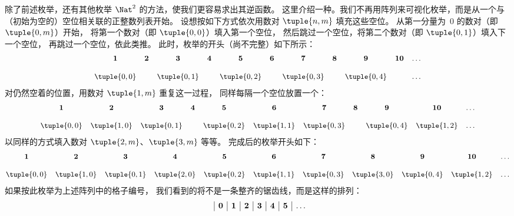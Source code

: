 \documentclass[../../../include/open-logic-section]{subfiles}
\begin{document}


\begin{explain}
除了前述枚举，还有其他枚举 $\Nat^2$ 的方法，使我们更容易求出其逆函数。
这里介绍一种。我们不再用阵列来可视化枚举，而是从一个与（初始为空的）空位相关联的正整数列表开始。
设想按如下方式依次用数对 $\tuple{n,m}$ 填充这些空位。
从第一分量为~$0$ 的数对（即 $\tuple{0,m}$）开始，
将第一个数对（即 $\tuple{0,0}$）填入第一个空位，
然后跳过一个空位，将第二个数对（即 $\tuple{0,1}$）填入下一个空位，
再跳过一个空位，依此类推。
此时，枚举的开头（尚不完整）如下所示：
\[\small
\begin{array}{@{}c c c c c c c c c c c@{}}
\mathbf 1 & \mathbf 2 & \mathbf 3 & \mathbf 4 & \mathbf 5 & \mathbf 6 & \mathbf 7 & \mathbf 8 & \mathbf 9 & \mathbf{10} & \dots \\ \\
\tuple{0,0} &  & \tuple{0,1} &  & \tuple{0,2} &  & \tuple{0,3} & & \tuple{0,4} &  & \dots \\
\end{array}
\]
对仍然空着的位置，用数对 $\tuple{1,m}$ 重复这一过程，
同样每隔一个空位放置一个：
\[\small
\begin{array}{@{}c c c c c c c c c c c@{}}
\mathbf 1 & \mathbf 2 & \mathbf 3 & \mathbf 4 & \mathbf 5 & \mathbf 6 & \mathbf 7 & \mathbf 8 & \mathbf 9 & \mathbf{10} & \dots \\ \\
\tuple{0,0} & \tuple{1,0} & \tuple{0,1} &  & \tuple{0,2} & \tuple{1,1} &
\tuple{0,3} & & \tuple{0,4} &  \tuple{1,2} & \dots \\
\end{array}
\]
以同样的方式填入数对 $\tuple{2,m}$、$\tuple{3,m}$ 等等。
完成后的枚举开头如下：
\[\small
\begin{array}{@{}cc c c c c c c c c c@{}}
\mathbf 1 & \mathbf 2 & \mathbf 3 & \mathbf 4 & \mathbf 5 & \mathbf 6 & \mathbf 7 & \mathbf 8 & \mathbf 9 & \mathbf{10} & \dots \\ \\
\tuple{0,0} & \tuple{1,0} & \tuple{0,1} & \tuple{2,0}  & \tuple{0,2} &
\tuple{1,1} & \tuple{0,3} & \tuple{3,0}  & \tuple{0,4} &  \tuple{1,2} & \dots \\
\end{array}
\]
如果按此枚举为上述阵列中的格子编号，
我们看到的将不是一条整齐的锯齿线，而是这样的排列：
\[
\begin{array}{ c | c | c | c | c | c | c | c }
& \mathbf 0 & \mathbf 1 & \mathbf 2 & \mathbf 3 & \mathbf 4 & \mathbf 5 & \dots \\

\end{array}\]
\end{explain}
\end{document}
